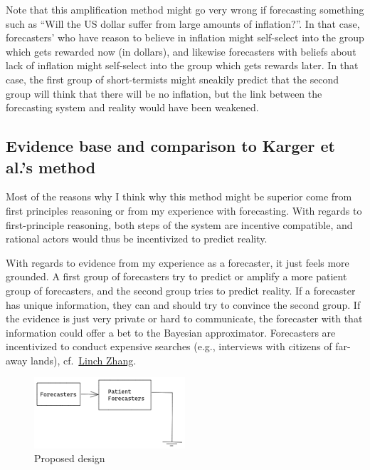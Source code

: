 \documentclass[]{article}
\begin{document}
Note that this amplification method might go very wrong if forecasting
something such as ``Will the US dollar suffer from large amounts of
inflation?''. In that case, forecasters' who have reason to believe in
inflation might self-select into the group which gets rewarded now (in
dollars), and likewise forecasters with beliefs about lack of inflation
might self-select into the group which gets rewards later. In that case,
the first group of short-termists might sneakily predict that the second
group will think that there will be no inflation, but the link between
the forecasting system and reality would have been weakened.

\hypertarget{evidence-base-and-comparison-to-karger-et-al.s-method}{%
\subsection{Evidence base and comparison to Karger et al.'s
method}\label{evidence-base-and-comparison-to-karger-et-al.s-method}}

Most of the reasons why I think why this method might be superior come
from first principles reasoning or from my experience with forecasting.
With regards to first-principle reasoning, both steps of the system are
incentive compatible, and rational actors would thus be incentivized to
predict reality.

With regards to evidence from my experience as a forecaster, it just
feels more grounded. A first group of forecasters try to predict or
amplify a more patient group of forecasters, and the second group tries
to predict reality. If a forecaster has unique information, they can and
should try to convince the second group. If the evidence is just very
private or hard to communicate, the forecaster with that information
could offer a bet to the Bayesian approximator. Forecasters are
incentivized to conduct expensive searches (e.g., interviews with
citizens of far-away lands),
cf.~\href{https://twitter.com/LinchZhang/status/1455759586158268417}{Linch
Zhang}.

\begin{figure}
\centering
\includegraphics[width=0.5\textwidth,height=\textheight]{diagrams/amplify-samotsvety-1.png}
\caption{Proposed design}
\end{figure}
\end{document}
